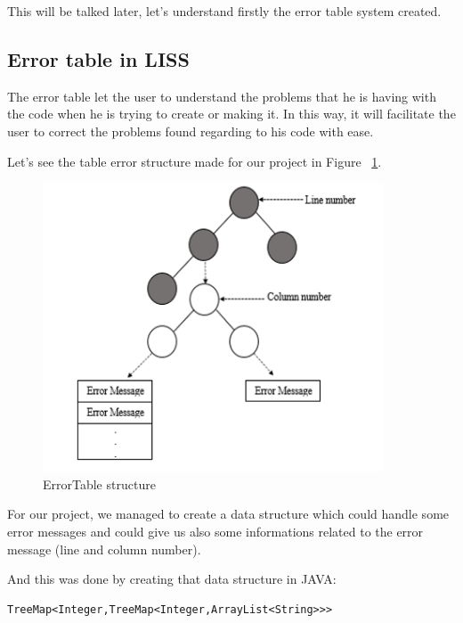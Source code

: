 \documentclass[
  oneside,
  11pt, a4paper,
  footinclude=true,
  headinclude=true,
  cleardoublepage=empty
]{scrbook}
\begin{document}
This will be talked later, let's understand firstly the error table system created.

\subsection{Error table in LISS}

The error table let the user to understand the problems that he is having with the code when he is trying to create or making it.
In this way, it will facilitate the user to correct the problems found regarding to his code with ease.

Let's see the table error structure made for our project in Figure ~\ref{fig:error_table_structure}.

\begin{figure}[h!]
  \centering
    \includegraphics[width=0.9\textwidth]{img/error_table_liss.png}
    \caption{ErrorTable structure}
    \label{fig:error_table_structure}
\end{figure}

For our project, we managed to create a data structure which could handle some error messages and could give us also some informations related to the error message (line and column number).

And this was done by creating that data structure in JAVA:

\begin{lstlisting}[caption={Data structure of the error table in LISS},label={lst:error_table_liss_java_implementation}]
	TreeMap<Integer,TreeMap<Integer,ArrayList<String>>>
\end{lstlisting}
\end{document}
